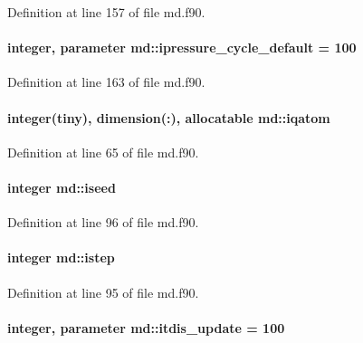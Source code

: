 Definition at line 157 of file md.\-f90.

\hypertarget{classmd_afa52eca88132d0756a9e81e162b056ef}{
\paragraph[{ipressure\-\_\-cycle\-\_\-default}]{\setlength{\rightskip}{0pt plus 5cm}integer, parameter md\-::ipressure\-\_\-cycle\-\_\-default = 100}}\label{classmd_afa52eca88132d0756a9e81e162b056ef}


Definition at line 163 of file md.\-f90.

\hypertarget{classmd_a434a8459f8a20994083317bf0d889b0f}{
\paragraph[{iqatom}]{\setlength{\rightskip}{0pt plus 5cm}integer(tiny), dimension(\-:), allocatable md\-::iqatom}}\label{classmd_a434a8459f8a20994083317bf0d889b0f}


Definition at line 65 of file md.\-f90.

\hypertarget{classmd_a331bc68dc7891f2de33ea5d390b68f9c}{
\paragraph[{iseed}]{\setlength{\rightskip}{0pt plus 5cm}integer md\-::iseed}}\label{classmd_a331bc68dc7891f2de33ea5d390b68f9c}


Definition at line 96 of file md.\-f90.

\hypertarget{classmd_abb1c2551002e22c44a1fc774a1afcefc}{
\paragraph[{istep}]{\setlength{\rightskip}{0pt plus 5cm}integer md\-::istep}}\label{classmd_abb1c2551002e22c44a1fc774a1afcefc}


Definition at line 95 of file md.\-f90.

\hypertarget{classmd_ad498808cf85ba9aaa23e36d14cd848e6}{
\paragraph[{itdis\-\_\-update}]{\setlength{\rightskip}{0pt plus 5cm}integer, parameter md\-::itdis\-\_\-update = 100}}\label{classmd_ad498808cf85ba9aaa23e36d14cd848e6}



